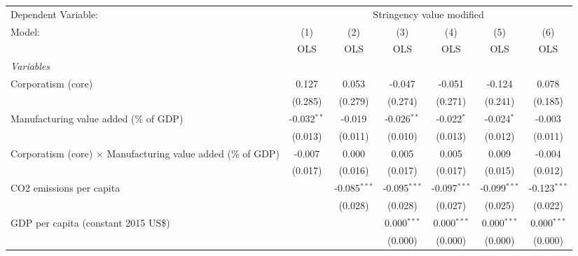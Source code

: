 
\begingroup
\centering
\begin{tabular}{lcccccc}
   \toprule
   Dependent Variable: & \multicolumn{6}{c}{Stringency value modified}\\
   Model:                                                              & (1)           & (2)            & (3)            & (4)            & (5)            & (6)\\  
                                                                       &  OLS          & OLS            & OLS            & OLS            & OLS            & OLS\\  
   \midrule
   \emph{Variables}\\
   Corporatism (core)                                                  & 0.127         & 0.053          & -0.047         & -0.051         & -0.124         & 0.078\\   
                                                                       & (0.285)       & (0.279)        & (0.274)        & (0.271)        & (0.241)        & (0.185)\\   
   Manufacturing value added (\% of GDP)                               & -0.032$^{**}$ & -0.019         & -0.026$^{**}$  & -0.022$^{*}$   & -0.024$^{*}$   & -0.003\\   
                                                                       & (0.013)       & (0.011)        & (0.010)        & (0.013)        & (0.012)        & (0.011)\\   
   Corporatism (core) $\times$ Manufacturing value added (\% of GDP)   & -0.007        & 0.000          & 0.005          & 0.005          & 0.009          & -0.004\\   
                                                                       & (0.017)       & (0.016)        & (0.017)        & (0.017)        & (0.015)        & (0.012)\\   
   CO2 emissions per capita                                            &               & -0.085$^{***}$ & -0.095$^{***}$ & -0.097$^{***}$ & -0.099$^{***}$ & -0.123$^{***}$\\   
                                                                       &               & (0.028)        & (0.028)        & (0.027)        & (0.025)        & (0.022)\\   
   GDP per capita (constant 2015 US\$)                                 &               &                & 0.000$^{***}$  & 0.000$^{***}$  & 0.000$^{***}$  & 0.000$^{***}$\\   
                                                                       &               &                & (0.000)        & (0.000)        & (0.000)        & (0.000)\\   

\end{tabular}
